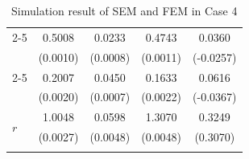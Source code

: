\documentclass[11pt]{article}
\begin{document}
{\begin{table}[h!]
{\begin{minipage}{0.5\textwidth}
\begin{tabular}{lcccc}
        \cmidrule{2-5}
         & 0.5008 & 0.0233 & 0.4743 & 0.0360 \\
        & (0.0010) & (0.0008) & (0.0011) & (-0.0257) \\
        \cmidrule{2-5}
         & 0.2007 & 0.0450 & 0.1633 & 0.0616 \\
        & (0.0020) & (0.0007) & (0.0022) & (-0.0367) \\
        \midrule
        \multirow{2}{*}{$r$} & 1.0048 & 0.0598 & 1.3070 & 0.3249 \\
         & (0.0027) & (0.0048) & (0.0048) & (0.3070) \\
        \hhline{=====}
        \end{tabular}
    \end{minipage}
}
\caption{Simulation result of SEM and FEM in Case 4}\label{tab:AppSimExoCase4}
\end{table}

}
\end{document}

